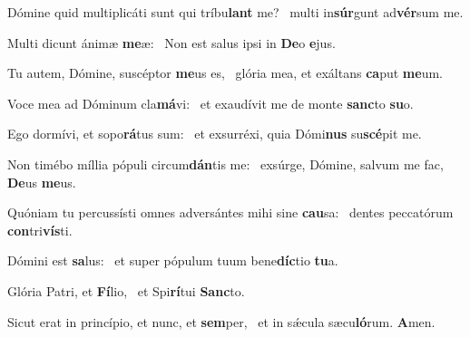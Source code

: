 \item Dómine quid multiplicáti sunt qui tríbu\textbf{lant} me?~\psstar{} multi in\textbf{súr}gunt ad\textbf{vér}sum me.
\item Multi dicunt ánimæ \textbf{me}æ:~\psstar{} Non est salus ipsi in \textbf{De}o \textbf{e}jus.
\item Tu autem, Dómine, suscéptor \textbf{me}us es,~\psstar{} glória mea, et exáltans \textbf{ca}put \textbf{me}um.
\item Voce mea ad Dóminum cla\textbf{má}vi:~\psstar{} et exaudívit me de monte \textbf{sanc}to \textbf{su}o.
\item Ego dormívi, et sopo\textbf{rá}tus sum:~\psstar{} et exsurréxi, quia Dómi\textbf{nus} su\textbf{scé}pit me.
\item Non timébo míllia pópuli circum\textbf{dán}tis me:~\psstar{} exsúrge, Dómine, salvum me fac, \textbf{De}us \textbf{me}us.
\item Quóniam tu percussísti omnes adversántes mihi sine \textbf{cau}sa:~\psstar{} dentes peccatórum \textbf{con}tri\textbf{vís}ti.
\item Dómini est \textbf{sa}lus:~\psstar{} et super pópulum tuum bene\textbf{díc}tio \textbf{tu}a.
\item Glória Patri, et \textbf{Fí}lio,~\psstar{} et Spi\textbf{rí}tui \textbf{Sanc}to.
\item Sicut erat in princípio, et nunc, et \textbf{sem}per,~\psstar{} et in sǽcula sæcu\textbf{ló}rum. \textbf{A}men.
